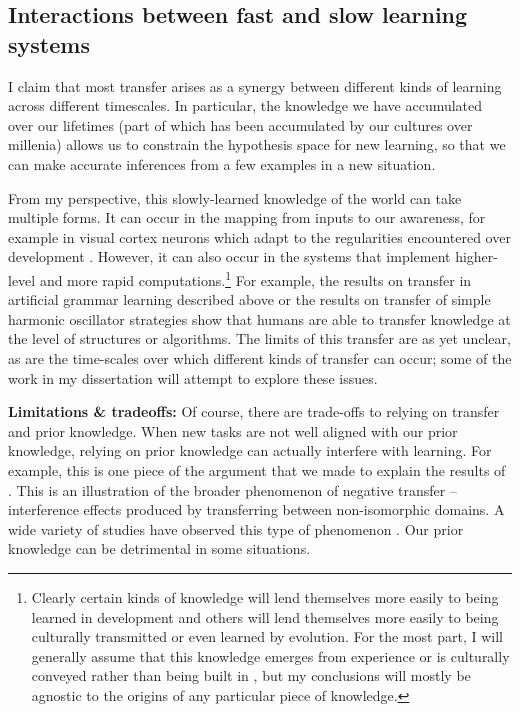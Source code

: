 \subsection{Interactions between fast and slow learning systems} \label{fast_slow_interactions}
I claim that most transfer arises as a synergy between different kinds of learning across different timescales. In particular, the knowledge we have accumulated over our lifetimes (part of which has been accumulated by our cultures over millenia) allows us to constrain the hypothesis space for new learning, so that we can make accurate inferences from a few examples in a new situation. \par 
From my perspective, this slowly-learned knowledge of the world can take multiple forms. It can occur in the mapping from inputs to our awareness, for example in visual cortex neurons which adapt to the regularities encountered over development \citep{Barlow1975}. However, it can also occur in the systems that implement higher-level and more rapid computations.\footnote{Clearly certain kinds of knowledge will lend themselves more easily to being learned in development and others will lend themselves more easily to being culturally transmitted or even learned by evolution. For the most part, I will generally assume that this knowledge emerges from experience or is culturally conveyed rather than being built in \citep{Hansen2017}, but my conclusions will mostly be agnostic to the origins of any particular piece of knowledge.} For example, the results on transfer in artificial grammar learning described above \citep{Tunney2001} or the results on transfer of simple harmonic oscillator strategies \citep{Day2011} show that humans are able to transfer knowledge at the level of structures or algorithms. The limits of this transfer are as yet unclear, as are the time-scales over which different kinds of transfer can occur; some of the work in my dissertation will attempt to explore these issues.\par  
\textbf{Limitations \& tradeoffs:} Of course, there are trade-offs to relying on transfer and prior knowledge. When new tasks are not well aligned with our prior knowledge, relying on prior knowledge can actually interfere with learning. For example, this is one piece of the argument that we made \citep{Lampinen2017b} to explain the results of \citet{Kaminski2008}. This is an illustration of the broader phenomenon of negative transfer -- interference effects produced by transferring between non-isomorphic domains. A wide variety of studies have observed this type of phenomenon \citep[e.g.][]{Luchins1942, Landrum2005}. Our prior knowledge can be detrimental in some situations. \par

